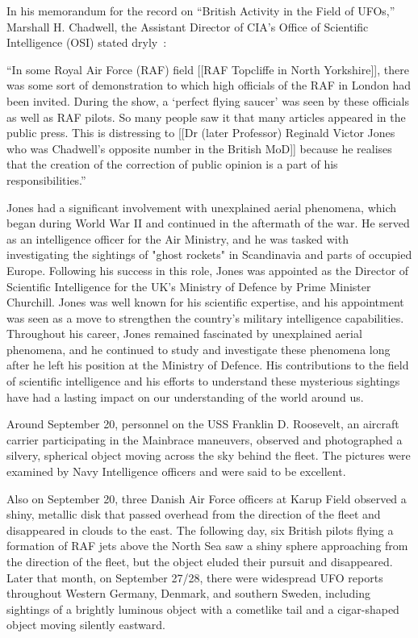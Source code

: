 In his memorandum for the record on ``British Activity in the Field of UFOs,''
Marshall H.  Chadwell, the Assistant Director of CIA's Office of Scientific Intelligence (OSI) stated dryly~\cite{Chadwell1952Brit,ClarkeTopcliff2022Sep}:
\begin{svgraybox}
``In some Royal Air Force (RAF) field [[RAF Topcliffe  in North Yorkshire]], there was some sort of demonstration to which high officials of the
RAF in London had been invited. During the show, a `perfect flying saucer' was seen
by these officials as well as RAF pilots.
So many people saw it that many articles appeared in the public press.
This is distressing to [[Dr (later Professor) Reginald Victor Jones who was Chadwell's opposite number in the British MoD]] because he realises that the creation of the correction of public opinion is a part of his responsibilities.''
\end{svgraybox}
Jones had a significant involvement with unexplained aerial phenomena, which began during World War II and continued in the aftermath of the war. He served as an intelligence officer for the Air Ministry, and he was tasked with investigating the sightings of "ghost rockets" in Scandinavia and parts of occupied Europe.
Following his success in this role, Jones was appointed as the Director of Scientific Intelligence for the UK's Ministry of Defence by Prime Minister Churchill. Jones was well known for his scientific expertise, and his appointment was seen as a move to strengthen the country's military intelligence capabilities.
Throughout his career, Jones remained fascinated by unexplained aerial phenomena, and he continued to study and investigate these phenomena long after he left his position at the Ministry of Defence. His contributions to the field of scientific intelligence and his efforts to understand these mysterious sightings have had a lasting impact on our understanding of the world around us.


Around September 20, personnel on the USS Franklin D. Roosevelt, an aircraft carrier participating in the Mainbrace maneuvers, observed and photographed a silvery, spherical object moving across the sky behind the fleet. The pictures were examined by Navy Intelligence officers and were said to be excellent.

Also on September 20, three Danish Air Force officers at Karup Field observed a shiny, metallic disk that passed overhead from the direction of the fleet and disappeared in clouds to the east. The following day, six British pilots flying a formation of RAF jets above the North Sea saw a shiny sphere approaching from the direction of the fleet, but the object eluded their pursuit and disappeared. Later that month, on September 27/28, there were widespread UFO reports throughout Western Germany, Denmark, and southern Sweden, including sightings
of a brightly luminous object with a cometlike tail and a cigar-shaped object moving silently eastward.

